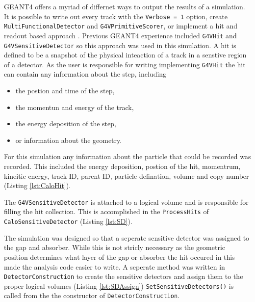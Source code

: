 GEANT4 offers a myriad of differnet ways to output the results of a simulation.
It is possible to write out every track with the \verb+Verbose = 1+ option, create \verb+MultiFunctionalDetector+ and \verb+G4VPrimitiveScorer+, or implement a hit and readout based approach \cite{cern_detector_2012}.
Previous GEANT4 experience included \verb+G4VHit+ and \verb+G4VSensitiveDetector+ so this approach was used in this simulation. 
A hit is defined to be a snapshot of the physical inteaction of a track in a senstive region of a detector.
As the user is responsible for writing implementing \verb+G4VHit+ the hit can contain any information about the step, including
\begin{itemize}
	\item the postion and time of the step,
	\item the momentun and energy of the track,
	\item the energy deposition of the step,
	\item or information about the geometry.
\end{itemize}
For this simulation any information about the particle that could be recorded was recorded. 
This included the energy deposition, postion of the hit, momentrum, kineitic energy, track ID, parent ID, particle defination, volume and copy number (Listing \ref{lst:CaloHit}).

The \verb+G4VSensitiveDetector+ is attached to a logical volume and is responsible for filling the hit collection.
This is accomplished in the \verb+ProcessHits+ of \verb+CaloSensitiveDetector+ (Listing \ref{lst:SD}).

The simulation was designed so that a seperate sensitive detector was assigned to the gap and absorber.
While this is not stricly necessary as the geometric position determines what layer of the gap or absorber the hit occured in this made the analysis code easier to write.
A seperate method was written in \verb+DetectorConstruction+ to create the sensitive detectors and assign them to the proper logical volumes (Listing \ref{lst:SDAssign})
\verb+SetSensitiveDetectors()+ is called from the the constructor of \verb+DetectorConstruction+.


